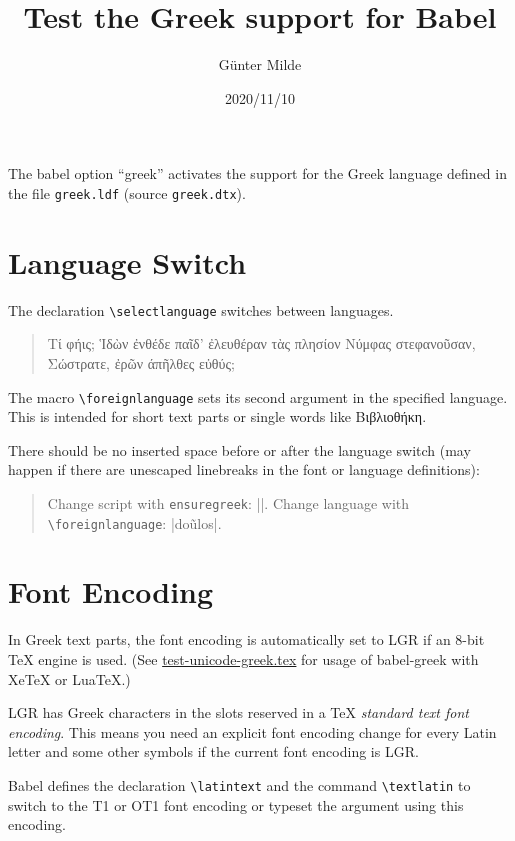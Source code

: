 \documentclass[a4paper]{article}
\begin{document}
\title{Test the Greek support for Babel}
\author{Günter Milde}
\date{2020/11/10}
\maketitle

The babel option ``greek'' activates the support for the Greek language
defined in the file \texttt{greek.ldf} (source \texttt{greek.dtx}).

\section{Language Switch}

The declaration \verb|\selectlanguage| switches between languages.

\begin{quote}
  Τί φήις; Ἱδὼν ἐνθέδε παῖδ’ ἐλευθέραν
  τὰς πλησίον Νύμφας στεφανοῦσαν, Σώστρατε,
  ἐρῶν άπῆλθες εὐθύς;
\end{quote}

The macro \verb|\foreignlanguage| sets its second argument in the specified
language. This is intended for short text parts or single words like
\foreignlanguage{greek}{Βιβλιοθήκη}.

There should be no inserted space before or after the language switch (may
happen if there are unescaped linebreaks in the font or language definitions):

\begin{quote}
  Change script with \verb|ensuregreek|: ||. Change
  language with \verb|\foreignlanguage|: |\foreignlanguage{greek}{do\~ulos}|.
\end{quote}

\section{Font Encoding}

In Greek text parts, the font encoding is automatically set to LGR if an
8-bit TeX engine is used. (See \url{test-unicode-greek.tex} for usage of
babel-greek with XeTeX or LuaTeX.)

LGR has Greek characters in the slots reserved in a TeX \emph{standard text
font encoding}. This means you need an explicit font encoding change for
every Latin letter and some other symbols if the current font encoding is
LGR.

Babel defines the declaration \verb|\latintext| and the command
\verb|\textlatin| to switch to the T1 or OT1 font encoding or typeset the
argument using this encoding.
\end{document}
